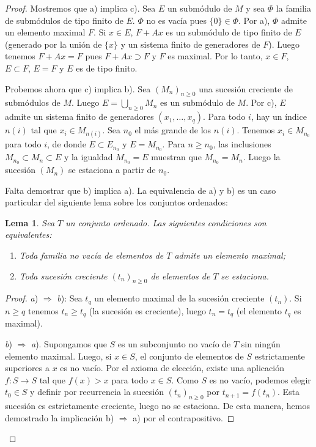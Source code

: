 \documentclass[oneside,bibtotoc,leqno,spanish]{amsbook}
\newcommand{\QED}{}%
\newcommand{\then}{\ensuremath{\Rightarrow}\xspace}
\renewcommand{\to}[1][]{\xrightarrow{#1}}
\numberwithin{equation}{section}
\theoremstyle{defi}
\theoremstyle{note}
\newtheorem{lemma}{Lema}
\theoremstyle{rem}
\numberwithin{theorem}{section}
\numberwithin{proposition}{section}
\numberwithin{definition}{section}
\numberwithin{lemma}{section}
\numberwithin{corollary}{section}
\numberwithin{example}{section}
\numberwithin{footnote}{section}%
\begin{document}
\begin{proof}
Mostremos que a) implica c). Sea $E$ un subm\'odulo de $M$ y
sea $\Phi$ la familia de subm\'odulos de tipo finito de $E$.
$\Phi$ no es vac\'ia pues $\{0\}\in\Phi$. Por a), $\Phi$ admite
un elemento maximal $F$. Si $x\in E$, $F+Ax$ es un subm\'odulo
de tipo finito de $E$ (generado por la uni\'on de $\{x\}$ y
un sistema finito de generadores de $F$). Luego tenemos
$F+Ax = F$ pues $F+Ax\supset F$ y $F$ es maximal. Por lo tanto,
$x\in F$, $E\subset F$, $E = F$ y $E$ es de tipo finito.

Probemos ahora que c) implica b). Sea $(M_{n})_{n\geq 0}$
una sucesi\'on creciente de subm\'odulos de $M$. Luego
$E = \bigcup_{n\geq 0}M_{n}$ es un subm\'odulo de $M$.
Por c), $E$ admite un sistema finito de generadores
$(x_{1},\dots,x_{q})$. Para todo $i$, hay un \'indice
$n(i)$ tal que $x_{i}\in M_{n(i)}$. Sea $n_{0}$ el m\'as
grande de los $n(i)$. Tenemos $x_{i}\in M_{n_{0}}$ para todo
$i$, de donde $E\subset E_{n_{0}}$ y $E = M_{n_{0}}$. Para
$n\geq n_{0}$, las inclusiones $M_{n_{0}}\subset M_{n}
\subset E$ y la igualdad $M_{n_{0}} = E$ muestran que
$M_{n_{0}} = M_{n}$. Luego la sucesi\'on $(M_{n})$ se
estaciona a partir de $n_{0}$.

Falta demostrar que b) implica a). La equivalencia
de a) y b) es un caso particular del siguiente lema sobre
los conjuntos ordenados:

\begin{lemma}
Sea $T$ un conjunto ordenado. Las siguientes condiciones son
equivalentes:
\begin{enumerate}
\item[a)] Toda familia no vac\'ia de elementos de $T$ admite un
elemento maximal;
\item[b)] Toda sucesi\'on creciente $(t_{n})_{n\geq 0}$ de
elementos de $T$ se estaciona.
\end{enumerate}
\end{lemma}

\begin{proof}
{\itshape a}) \then{ \itshape b}): Sea $t_{q}$ un elemento maximal de la sucesi\'on
creciente $(t_{n})$. Si $n\geq q$ tenemos $t_{n}\geq t_{q}$
(la sucesi\'on es creciente), luego $t_{n} = t_{q}$ (el elemento
$t_{q}$ es maximal).

{\itshape b}) \then{ \itshape a}). Supongamos que $S$ es un subconjunto no vac\'io
de $T$ sin ning\'un elemento maximal. Luego, si $x\in S$, el conjunto
de elementos de $S$ estrictamente superiores a $x$ es no
vac\'io. Por el axioma de elecci\'on, existe una aplicaci\'on
$f:S\to S$ tal que $f(x) > x$ para todo $x\in S$. Como $S$ es
no vac\'io, podemos elegir $t_{0}\in S$ y definir por recurrencia
la sucesi\'on $(t_{n})_{n\geq 0}$ por $t_{n+1}=f(t_{n})$.
Esta sucesi\'on es estrictamente creciente, luego no se estaciona.
De esta manera, hemos demostrado la implicaci\'on b) \then a)
por el contrapositivo. \QED
\end{proof}
\end{proof}
\end{document}
